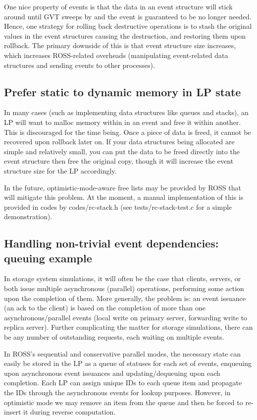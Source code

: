 \documentclass[conference,10pt,compsocconf,onecolumn]{IEEEtran}
\begin{document}
One nice property of events is that the data in an event structure will stick
around until GVT sweeps by and the event is guaranteed to be no longer needed.
Hence, one strategy for rolling back destructive operations is to stash the
original values in the event structures causing the destruction, and restoring
them upon rollback. The primary downside of this is that event structure size
increases, which increases ROSS-related overheads (manipulating event-related
data structures and sending events to other processes).

\subsection{Prefer static to dynamic memory in LP state}

In many cases (such as implementing data structures like queues and stacks), an
LP will want to malloc memory within in an event and free it within another.
This is discouraged for the time being. Once a piece of data is freed, it
cannot be recovered upon rollback later on. If your data structures being
allocated are simple and relatively small, you can put the data to be freed
directly into the event structure then free the original copy, though it will
increase the event structure size for the LP accordingly.

In the future, optimistic-mode-aware free lists may be provided by ROSS that
will mitigate this problem. At the moment, a manual implementation of this is
provided in codes by codes/rc-stack.h (see tests/rc-stack-test.c for a
simple demonstration).

\subsection{Handling non-trivial event dependencies: queuing example}

In storage system simulations, it will often be the case that clients, servers,
or both issue multiple asynchronous (parallel) operations, performing some
action upon the completion of them. More generally, the problem is: an event
issuance (an ack to the client) is based on the completion of more than one
asynchronous/parallel events (local write on primary server, forwarding write to
replica server). Further complicating the matter for storage simulations, there
can be any number of outstanding requests, each waiting on multiple events.

In ROSS's sequential and conservative parallel modes, the necessary state can
easily be stored in the LP as a queue of statuses for each set of events,
enqueuing upon asynchronous event issuances and updating/dequeuing upon each
completion. Each LP can assign unique IDs to each queue item and propagate the
IDs through the asynchronous events for lookup purposes. However, in optimistic
mode we may remove an item from the queue and then be forced to re-insert it
during reverse computation.
\end{document}
